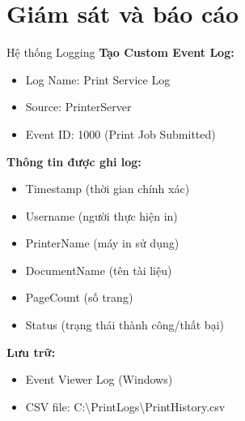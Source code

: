 \documentclass{beamer}
\begin{document}
    \section{Giám sát và báo cáo}
    \begin{frame}{Hệ thống Logging}
        \textbf{Tạo Custom Event Log:}
        \begin{itemize}
            \item Log Name: Print Service Log
            \item Source: PrinterServer
            \item Event ID: 1000 (Print Job Submitted)
        \end{itemize}
        
        \vspace{0.3cm}
        \textbf{Thông tin được ghi log:}
        \begin{itemize}
            \item Timestamp (thời gian chính xác)
            \item Username (người thực hiện in)
            \item PrinterName (máy in sử dụng)
            \item DocumentName (tên tài liệu)
            \item PageCount (số trang)
            \item Status (trạng thái thành công/thất bại)
        \end{itemize}
        
        \vspace{0.3cm}
        \textbf{Lưu trữ:}
        \begin{itemize}
            \item Event Viewer Log (Windows)
            \item CSV file: C:\textbackslash PrintLogs\textbackslash PrintHistory.csv
        \end{itemize}
    \end{frame}
    
\end{document}
